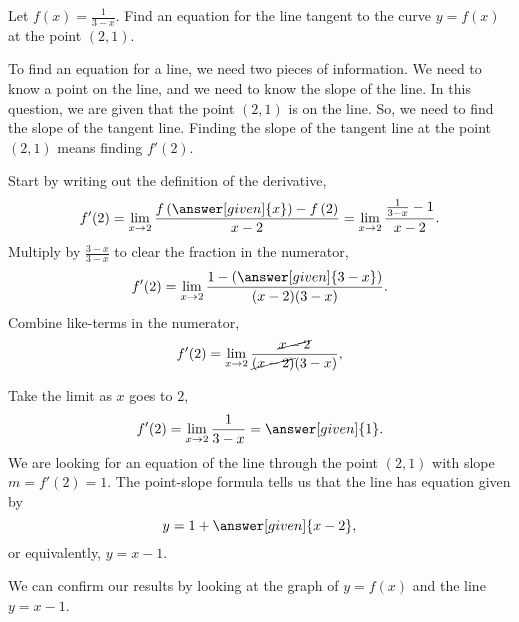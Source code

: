 \documentclass{ximera}
\begin{document}
\begin{example}
	Let $f(x) = \frac{1}{3-x}$.
	Find an equation for the line tangent to the curve $y=f(x)$ at the point $(2, 1)$.
 	\begin{explanation}
		To find an equation for a line, we need two pieces of information.  We need to know
		a point on the line, and we need to know the slope of the line.  In this question, we are given
		that  the point $(2,1)$ is on the line.  So, we need to find the slope of the tangent line.
		Finding the slope of the tangent line at the point $(2,1)$ means finding $f'(2)$.
	    
		Start by writing out the definition of the derivative,
		\[ f'(2) = \lim_{x\to 2} \frac{f\left(\answer[given]{x}\right)-f\left(2\right)}{x-2} = \lim_{x\to 2} \frac{\frac{1}{3-x}-1}{x-2}. \]
		Multiply by $\frac{3-x}{3-x}$ to clear the fraction in the numerator,
		\[ f'(2) = \lim_{x\to 2} \frac{1 - \left(\answer[given]{3-x}\right)}{(x-2)(3-x)}. \]
		Combine like-terms in the numerator,
		\[ f'(2) = \lim_{x\to 2} \frac{\cancel{x-2}}{\cancel{(x-2)}(3-x)}, \]
	    	
		Take the limit as $x$ goes to $2$,
	    	\[ f'(2)= \lim_{x\to 2} \frac{1}{3-x} = \answer[given]{1}. \]
	    	We are looking for an equation of the line through the point
	    	$(2,1)$ with slope $m = f'(2) = 1$.  The point-slope formula tells
	    	us that the line has equation given by
	    	\[ y= 1+\answer[given]{x-2 }, \]
	 	or equivalently, $y=x-1$.
	 	
		\begin{onlineOnly}
			We can confirm our results by looking at the graph of $y=f(x)$ and the line $y=x-1$. 
			  \begin{image}
\end{image}
\end{onlineOnly}
\end{explanation}
\end{example}
\end{document}
